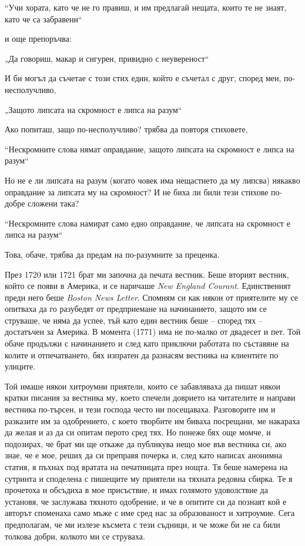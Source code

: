 \documentclass[12pt]{book}
\begin{document}
	“Учи хората, като че не го правиш,
	и им предлагай нещата, които те не знаят, като че са забравени“

и още препоръчва: 

	„Да говориш, макар и сигурен, привидно с неувереност“ 

И би могъл да съчетае с този стих един, който е съчетал с друг, според мен, по-несполучливо,

	„Защото липсата на скромност е липса на разум“

Ако попиташ, защо по-несполучливо? трябва да повторя стиховете,

	“Нескромните слова нямат оправдание,
	защото липсата на скромност е липса на разум“

Но не е ли липсата на разум (когато човек има нещастието да му липсва) някакво оправдание за липсата му на скромност? И не биха ли били тези стихове по-добре сложени така?

	“Нескромните слова намират само едно оправдание,
	че липсата на скромност е липса на разум“

Това, обаче, трябва да предам на по-разумните за преценка.

През 1720 или 1721 брат ми започна да печата вестник. Беше вторият вестник, който се появи в Америка, и се наричаше \textit{New England Courant}.  Единственият преди него беше \textit{Boston News Letter}. Спомням си как някои от приятелите му се опитваха да го разубедят от предприемане на начинанието, защото им се струваше, че няма да успее, тъй като един вестник беше – според тях – достатъчен за Америка. В момента (1771) има не по-малко от двадесет и пет. Той обаче продължи с начинанието и след като приключи работата по съставяне на колите и отпечатването, бях изпратен да разнасям вестника на клиентите по улиците. 

Той имаше някои хитроумни приятели, които се забавляваха да пишат някои кратки писания за вестника му, което спечели доврието на читателите и направи вестника по-търсен, и тези господа често ни посещаваха. Разговорите им и разказите им за одобрението, с което творбите им биваха посрещани, ме накараха да желая и аз да си опитам перото сред тях. Но понеже бях още момче, и подозирах, че брат ми ще откаже да публикува нещо мое във вестника си, ако знае, че е мое, реших да си преправя почерка и, след като написах анонимна статия, я пъхнах под вратата на печатницата през нощта. Тя беше намерена на сутринта и споделена с пишещите му приятели на тяхната редовна сбирка. Те я прочетоха и обсъдиха в мое присъствие, и имах голямото удоволствие да установя, че заслужава тяхното одобрение, и че в опитите си да познаят кой е авторът споменаха само мъже с име сред нас за образованост и хитроумие. Сега предполагам, че ми излезе късмета с тези съдници, и че може би не са били толкова добри, колкото ми се струваха.
\end{document}

